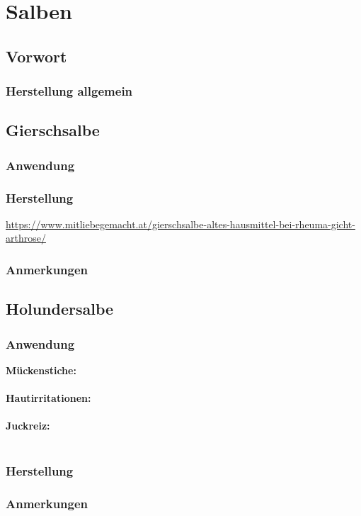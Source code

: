 \chapter{Salben}

\section{Vorwort}

\lipsum[1-5]
\newpage



\subsection{Herstellung allgemein}



\section{Gierschsalbe}

\subsection{Anwendung}

\subsection{Herstellung}

\url{https://www.mitliebegemacht.at/gierschsalbe-altes-hausmittel-bei-rheuma-gicht-arthrose/}

\subsection{Anmerkungen}





\section{Holundersalbe}

\subsection{Anwendung}

\textbf{Mückenstiche:} \\ \\
\textbf{Hautirritationen:} \\ \\
\textbf{Juckreiz:} \\ \\


\subsection{Herstellung}

\subsection{Anmerkungen}